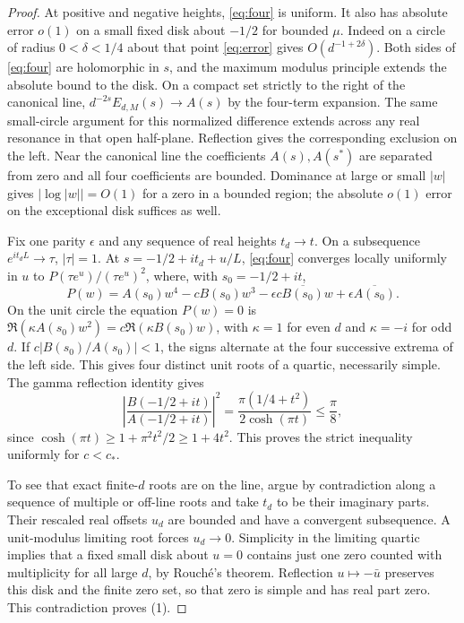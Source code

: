 \begin{proof}
At positive and negative heights, \eqref{eq:four} is uniform. It also
has absolute error $o(1)$ on a small fixed disk about $-1/2$ for bounded
$\mu$. Indeed on a circle of radius $0<\delta<1/4$ about that point
\eqref{eq:error} gives $O(d^{-1+2\delta})$. Both sides of
\eqref{eq:four} are holomorphic in $s$, and the maximum modulus principle
extends the absolute bound to the disk. On a compact set strictly
to the right of the canonical line, $d^{-2s}E_{d,M}(s)\to A(s)$
by the four-term expansion. The same small-circle argument for this
normalized difference extends across any real resonance in that open
half-plane. Reflection gives the corresponding exclusion on the left.
Near the canonical line the coefficients $A(s),A(s^*)$ are separated
from zero and all four coefficients are bounded. Dominance at large or
small $|w|$ gives $|\log|w||=O(1)$ for a zero in a bounded region;
the absolute $o(1)$ error on the exceptional disk suffices as well.

Fix one parity $\epsilon$ and any sequence of real heights $t_d\to t$.
On a subsequence $e^{it_d L}\to\tau$, $|\tau|=1$. At
$s=-1/2+it_d+u/L$, \eqref{eq:four} converges locally uniformly in $u$
to $P(\tau e^u)/(\tau e^u)^2$, where, with $s_0=-1/2+it$,
\begin{equation}\label{eq:quartic}
 P(w)= A(s_0) w^4-c B(s_0)w^3
             -\epsilon c\overline{B(s_0)}w+\epsilon\overline{A(s_0)} .
\end{equation}
On the unit circle the equation $P(w)=0$ is
$\Re(\kappa A(s_0)w^2)=c\Re(\kappa B(s_0)w)$, with $\kappa=1$ for
even $d$ and $\kappa=-i$ for odd $d$.
If $c|B(s_0)/A(s_0)|<1$, the signs alternate at the four successive
extrema of the left side. This gives four distinct unit roots of a
quartic, necessarily simple. The gamma reflection identity gives
\[
 \left|\frac{B(-1/2+it)}{A(-1/2+it)}\right|^2
     =\frac{\pi(1/4+t^2)}{2\cosh(\pi t)}
     \le\frac{\pi}{8},
\]
since $\cosh(\pi t)\ge1+\pi^2t^2/2\ge1+4t^2$.
This proves the strict inequality uniformly for $c<c_*$.

To see that exact finite-$d$ roots are on the line, argue by
contradiction along a sequence of multiple or off-line roots and take
$t_d$ to be their imaginary parts. Their rescaled real offsets $u_d$
are bounded and have a convergent subsequence. A unit-modulus limiting
root forces $u_d\to0$. Simplicity in the limiting quartic implies that
a fixed small disk about $u=0$ contains just one zero counted with
multiplicity for all large $d$, by Rouch\'e's theorem. Reflection
$u\mapsto-\bar u$ preserves this disk and the finite zero set, so that
zero is simple and has real part zero. This contradiction proves (1).


\end{proof}
